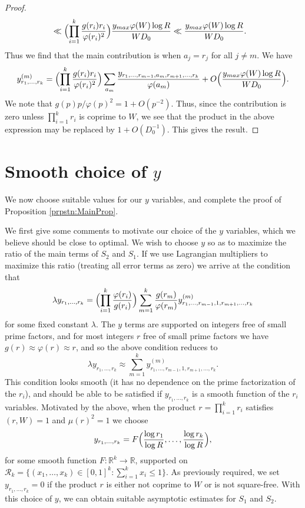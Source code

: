 \documentclass[12pt,a4paper]{amsart}
\theoremstyle{plain}
\numberwithin{sblmm}{thrm}
\numberwithin{equation}{section}
\renewcommand{\phi}{\varphi}
\begin{document}
\begin{proof}
\begin{align}
&\ll \Bigl(\prod_{i=1}^k \frac{g(r_i)r_i}{\phi(r_i)^2}\Bigr)\frac{y_{max}\phi(W)\log{R}}{W D_0}\ll \frac{y_{max} \phi(W) \log{R}}{W D_0}.
\end{align}
Thus we find that the main contribution is when $a_j=r_j$ for all $j\ne m$. We have
\begin{align}
y^{(m)}_{r_1,\dotsc,r_k}=\Bigl(\prod_{i=1}^k\frac{g(r_i)r_i}{\phi(r_i)^2}\Bigr)\sum_{a_m}\frac{y_{r_1,\dotsc, r_{m-1},a_m,r_{m+1},\dotsc,r_k}}{\phi(a_m)}+O\Bigl(\frac{y_{max} \phi(W) \log{R}}{W D_0}\Bigr). 
\end{align}
We note that $g(p)p/\phi(p)^2=1+O(p^{-2})$. Thus, since the contribution is zero unless $\prod_{i=1}^k r_i$ is coprime to $W$, we see that the product in the above expression may be replaced by $1+O(D_0^{-1})$. This gives the result.
\end{proof}
\section{\texorpdfstring{Smooth choice of $y$}{Smooth choice of y}}
We now choose suitable values for our $y$ variables, and complete the proof of Proposition \ref{prpstn:MainProp}.

We first give some comments to motivate our choice of the $y$ variables, which we believe should be close to optimal. We wish to choose $y$ so as to maximize the ratio of the main terms of $S_2$ and $S_1$. If we use Lagrangian multipliers to maximize this ratio (treating all error terms as zero) we arrive at the condition that
\begin{equation}
\lambda y_{r_1,\dotsc,r_k}=\Bigl(\prod_{i=1}^k \frac{\phi(r_i)}{g(r_i)}\Bigr)\sum_{m=1}^k\frac{g(r_m)}{\phi(r_m)}y^{(m)}_{r_1,\dotsc,r_{m-1},1,r_{m+1},\dotsc,r_k}
\end{equation}
for some fixed constant $\lambda$. The $y$ terms are supported on integers free of small prime factors, and for most integers $r$ free of small prime factors we have $g(r)\approx\phi(r)\approx r$, and so the above condition reduces to
\begin{equation}
\lambda y_{r_1,\dotsc,r_k}\approx\sum_{m=1}^{k}y^{(m)}_{r_1,\dotsc,r_{m-1},1,r_{m+1},\dotsc,r_k}.
\end{equation}
This condition looks smooth (it has no dependence on the prime factorization of the $r_i$), and should be able to be satisfied if $y_{r_1,\dotsc,r_k}$ is a smooth function of the $r_i$ variables. Motivated by the above, when the product $r=\prod_{i=1}^k r_i$ satisfies $(r,W)=1$ and $\mu(r)^2=1$ we choose
\begin{equation}
y_{r_1,\dotsc,r_k}=F\Bigl(\frac{\log{r_1}}{\log{R}},\dotsc,\frac{\log{r_k}}{\log{R}}\Bigr),\label{eq:YChoice}
\end{equation}
for some smooth function $F:\mathbb{R}^k\rightarrow\mathbb{R}$, supported on $\mathcal{R}_k=\{(x_1,\dotsc,x_k)\in[0,1]^k:\sum_{i=1}^kx_i\le 1\}$. As previously required, we set $y_{r_1,\dotsc,r_k}=0$ if the product $r$ is either not coprime to $W$ or is not square-free. With this choice of $y$, we can obtain suitable asymptotic estimates for $S_1$ and $S_2$.
\end{document}
